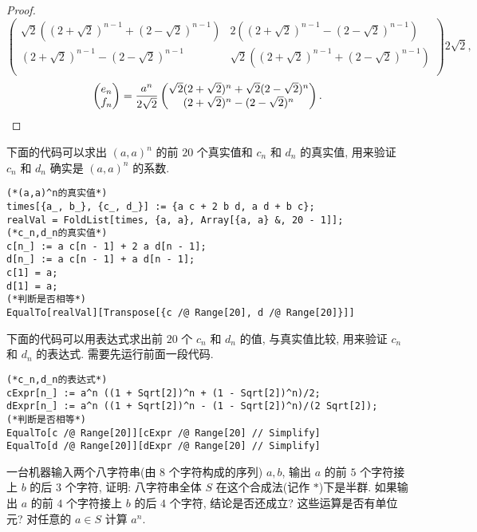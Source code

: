 \documentclass[color=black,device=normal,lang=cn,mode=geye]{elegantnote}
\begin{document}
\begin{proof}
\[{\begin{pmatrix}
        \sqrt{2}((2+\sqrt{2})^{n-1}+(2-\sqrt{2})^{n-1}) & 2((2+\sqrt{2})^{n-1}-(2-\sqrt{2})^{n-1}) \\
        (2+\sqrt{2})^{n-1}-(2-\sqrt{2})^{n-1} & \sqrt{2}((2+\sqrt{2})^{n-1}+(2-\sqrt{2})^{n-1}) \\
    \end{pmatrix}}{2\sqrt{2}},\]
    \[\begin{pmatrix}
        e_n \\ f_n
    \end{pmatrix}=\dfrac{a^n}{2\sqrt{2}}\begin{pmatrix}
        \sqrt{2}(2+\sqrt{2})^n+\sqrt{2}(2-\sqrt{2})^n \\
        (2+\sqrt{2})^n-(2-\sqrt{2})^n
    \end{pmatrix}.\qedhere\]
\end{proof}
\begin{note}
    下面的代码可以求出 $(a,a)^n$ 的前 $20$ 个真实值和 $c_n$ 和 $d_n$ 的真实值, 用来验证 $c_n$ 和 $d_n$ 确实是 $(a,a)^n$ 的系数.
    \begin{lstlisting}(*(a,a)^n的真实值*)
times[{a_, b_}, {c_, d_}] := {a c + 2 b d, a d + b c};
realVal = FoldList[times, {a, a}, Array[{a, a} &, 20 - 1]];
(*c_n,d_n的真实值*)
c[n_] := a c[n - 1] + 2 a d[n - 1];
d[n_] := a c[n - 1] + a d[n - 1];
c[1] = a;
d[1] = a;
(*判断是否相等*)
EqualTo[realVal][Transpose[{c /@ Range[20], d /@ Range[20]}]]\end{lstlisting}

    下面的代码可以用表达式求出前 $20$ 个 $c_n$ 和 $d_n$ 的值, 与真实值比较, 用来验证 $c_n$ 和 $d_n$ 的表达式. 需要先运行前面一段代码.
    \begin{lstlisting}
(*c_n,d_n的表达式*)
cExpr[n_] := a^n ((1 + Sqrt[2])^n + (1 - Sqrt[2])^n)/2;
dExpr[n_] := a^n ((1 + Sqrt[2])^n - (1 - Sqrt[2])^n)/(2 Sqrt[2]);
(*判断是否相等*)
EqualTo[c /@ Range[20]][cExpr /@ Range[20] // Simplify]
EqualTo[d /@ Range[20]][dExpr /@ Range[20] // Simplify]\end{lstlisting}
\end{note}
\begin{exercisec}[5.1.3]
    一台机器输入两个八字符串(由 $8$ 个字符构成的序列) $a,b$, 输出 $a$ 的前 $5$ 个字符接上 $b$ 的后 $3$ 个字符, 证明: 八字符串全体 $S$ 在这个合成法(记作 $*$)下是半群. 如果输出 $a$ 的前 $4$ 个字符接上 $b$ 的后 $4$ 个字符, 结论是否还成立? 这些运算是否有单位元? 对任意的 $a\in S$ 计算 $a^n$.
\end{exercisec}
\end{document}
